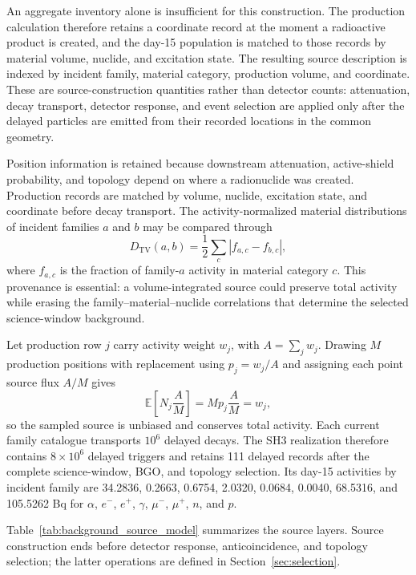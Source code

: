 \documentclass[11pt]{article}
\begin{document}
An aggregate inventory alone is insufficient for this construction. The
production calculation therefore retains a coordinate record at the moment a
radioactive product is created, and the day-15 population is matched to those
records by material volume, nuclide, and excitation state. The resulting source
description is indexed by incident family, material category, production volume,
and coordinate. These are source-construction quantities rather than detector
counts: attenuation, decay transport, detector response, and event selection are
applied only after the delayed particles are emitted from their recorded
locations in the common geometry.

Position information is retained because downstream attenuation, active-shield
probability, and topology depend on where a radionuclide was created. Production
records are matched by volume, nuclide, excitation state, and coordinate before
decay transport. The activity-normalized material distributions of incident
families $a$ and $b$ may be compared through
\begin{equation}
  D_{\mathrm{TV}}(a,b)=\frac12\sum_c|f_{a,c}-f_{b,c}|,
\end{equation}
where $f_{a,c}$ is the fraction of family-$a$ activity in material category $c$.
This provenance is essential: a volume-integrated source could preserve total
activity while erasing the family--material--nuclide correlations that determine
the selected science-window background.

Let production row $j$ carry activity weight $w_j$, with
$A=\sum_jw_j$. Drawing $M$ production positions with replacement using
$p_j=w_j/A$ and assigning each point source flux $A/M$ gives
\begin{equation}
  \mathbb{E}\!\left[N_j\frac{A}{M}\right]=Mp_j\frac{A}{M}=w_j,
\end{equation}
so the sampled source is unbiased and conserves total activity. Each current
family catalogue transports $10^6$ delayed decays. The SH3 realization therefore
contains $8\times10^6$ delayed triggers and retains 111 delayed records after the
complete science-window, BGO, and topology selection. Its day-15 activities by
incident family are 34.2836, 0.2663, 0.6754, 2.0320, 0.0684, 0.0040, 68.5316,
and 105.5262 Bq for $\alpha$, $e^-$, $e^+$, $\gamma$, $\mu^-$, $\mu^+$, $n$,
and $p$.

Table~\ref{tab:background_source_model} summarizes the source layers. Source
construction ends before detector response, anticoincidence, and topology
selection; the latter operations are defined in Section~\ref{sec:selection}.
\end{document}
